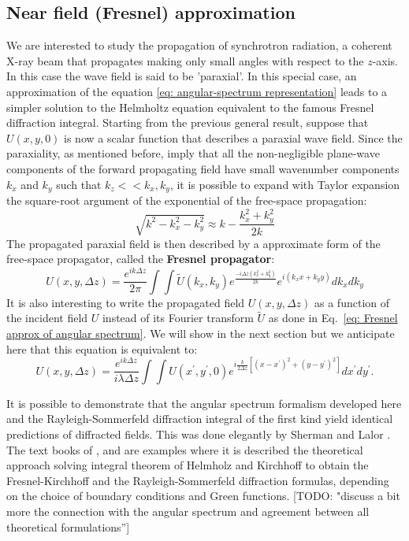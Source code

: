 \documentclass{iucr}              %
\newcommand{\todo}[1]{{\color{red}[TODO: "#1'']}}
\begin{document}
\subsection{Near field (Fresnel) approximation}

We are interested to study the propagation of synchrotron radiation, a coherent X-ray beam that propagates making only small angles with respect to the $z$-axis. In this case the wave field is said to be 'paraxial'. In this special case, an approximation of the equation \ref{eq: angular-spectrum representation} leads to a simpler solution to the Helmholtz equation equivalent to the famous Fresnel diffraction integral. Starting from the previous general result, suppose that $U(x,y,0)$ is now a scalar function that describes a paraxial wave field. Since the paraxiality, as mentioned before, imply that all the non-negligible plane-wave components of the forward propagating field have small wavenumber components $k_x$ and $k_y$ such that $k_z << k_x, k_y$, it is possible to expand with Taylor expansion the square-root argument of the exponential of the free-space propagation:
\begin{equation}\label{eq: binomial approx}
\sqrt{k^2 -k_x^2-k_y^2}\approx k -\frac{k_x^2+k_y^2}{2k}	
\end{equation}
The propagated paraxial field is then described by a approximate form of the free-space propagator, called the \textbf{Fresnel propagator}:
\begin{equation}\label{eq: Fresnel approx of angular spectrum}
U(x, y, \Delta z) = \frac {e^{i k \Delta z}}{ 2 \pi}\int \int \widetilde{U}(k_x, k_y)  e^{\frac{-i \Delta z (k_x^2 + k_y^2) }{2k}} e^{i(k_x x + k_y y)}dk_x dk_y
\end{equation}
It is also interesting to write the propagated field $U(x,y,\Delta z)$ as a function of the incident field $U$ instead of its Fourier transform $\widetilde{U}$ as done in Eq.~\ref{eq: Fresnel approx of angular spectrum}. We will show in the next section but we anticipate here that this equation is equivalent to: 
\begin{equation}\label{eq: usualfresnel}
\boxed{
U(x,y, \Delta z) = \frac {e^{i k\Delta z }}{ i \lambda \Delta z} \int  \int U(x^\prime, y^\prime, 0) e^{i \frac{k}{2 \Delta z} [(x - x^\prime)^2 + (y - y^\prime)^2]} dx^\prime dy^\prime
}.
\end{equation}

It is possible to demonstrate that the angular spectrum formalism developed here and the Rayleigh-Sommerfeld diffraction integral of the first kind yield identical predictions of diffracted fields. This was done elegantly by Sherman \cite{Sherman:67} and Lalor \cite{Lalor:68}. The text books of \cite{goodmanfourier}, \cite{nieto} and \cite{paganin_book} are examples where it is described the theoretical approach solving integral theorem of Helmholz and Kirchhoff to obtain the Fresnel-Kirchhoff and the Rayleigh-Sommerfeld diffraction formulas, depending on the choice of boundary conditions and Green functions. \todo{discuss a bit more the connection with the angular spectrum and agreement between all theoretical formulations}
\end{document}
